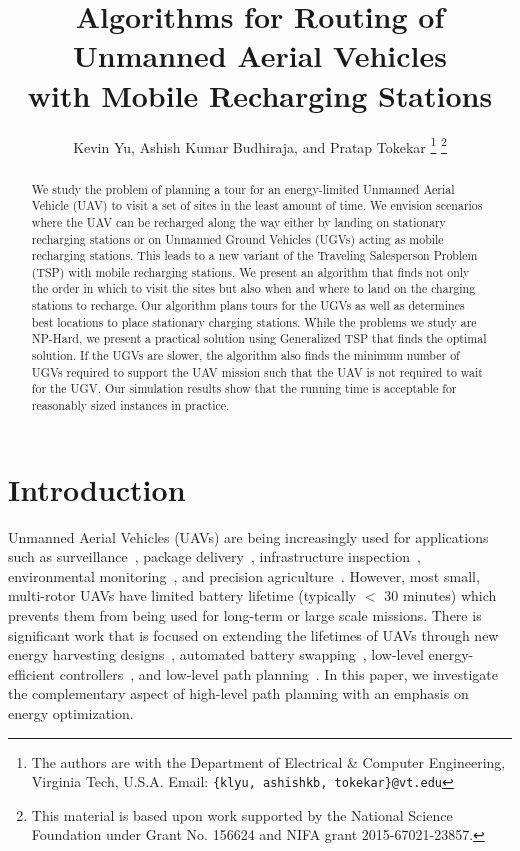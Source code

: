 \documentclass[letterpaper,10pt,conference]{ieeeconf}
\begin{document}
\title{\LARGE \bf Algorithms for Routing of Unmanned Aerial Vehicles\\ with Mobile Recharging Stations}

\author{Kevin Yu, Ashish Kumar Budhiraja, and Pratap Tokekar%
\thanks{The authors are with the Department of Electrical \& Computer Engineering, Virginia Tech, U.S.A. Email: \texttt{\small \{klyu, ashishkb, tokekar\}@vt.edu}}%
\thanks{This material is based upon work supported by the National Science Foundation under Grant No. 156624 and NIFA grant 2015-67021-23857.}}

\maketitle

\begin{abstract}
We study the problem of planning a tour for an energy-limited Unmanned Aerial Vehicle (UAV) to visit a set of sites in the least amount of time. We envision scenarios where the UAV can be recharged along the way either by landing on stationary recharging stations or on Unmanned Ground Vehicles (UGVs) acting as mobile recharging stations. This leads to a new variant of the Traveling Salesperson Problem (TSP) with mobile recharging stations. We present an algorithm that finds not only the order in which to visit the sites but also when and where to land on the charging stations to recharge. Our algorithm plans tours for the UGVs as well as determines best locations to place stationary charging stations. While the problems we study are NP-Hard, we present a practical solution using Generalized TSP that finds the optimal solution. If the UGVs are slower, the algorithm also finds the minimum number of UGVs required to support the UAV mission such that the UAV is not required to wait for the UGV. Our simulation results show that the running time is acceptable for reasonably sized instances in practice.
\end{abstract}

\IEEEpeerreviewmaketitle

\section{Introduction}
Unmanned Aerial Vehicles (UAVs) are being increasingly used for applications such as surveillance~\cite{michael2011persistent}, package delivery~\cite{thiels2015use}, infrastructure inspection~\cite{liu2014review,ozaslaninspection}, environmental monitoring~\cite{dunbabin2012environmental}, and precision agriculture~\cite{das2015devices,tokekar2016sensor}. However, most small, multi-rotor UAVs have limited battery lifetime (typically $<$ 30 minutes) which prevents them from being used for long-term or large scale missions. There is significant work that is focused on extending the lifetimes of UAVs through new energy harvesting designs~\cite{morton2015solar}, automated battery swapping~\cite{toksoz2011automated}, low-level energy-efficient controllers~\cite{hosseini2013optimal}, and low-level path planning~\cite{morbidi2016minimum}. In this paper, we investigate the complementary aspect of high-level path planning with an emphasis on energy optimization.
\end{document}
